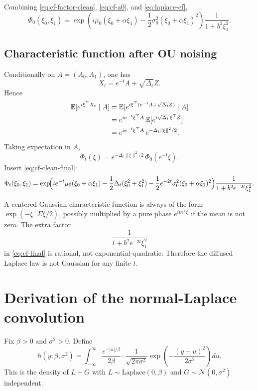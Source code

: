 \documentclass[11pt,a4paper]{article}
\newcommand{\E}{\mathbb{E}}
\newcommand{\Dt}{\Delta_t}
\begin{document}
Combining \eqref{eq:cf-factor-clean}, \eqref{eq:cf-a0}, and \eqref{eq:laplace-cf},
\begin{equation}
\Phi_0(\xi_0,\xi_1)
=
\exp\!\left(
 i\mu_0(\xi_0+\alpha\xi_1)
 - \frac12 \sigma_0^2 (\xi_0+\alpha\xi_1)^2
\right)
\frac{1}{1+b^2 \xi_1^2}.
\label{eq:cf-clean-final}
\end{equation}

\subsection{Characteristic function after OU noising}

Conditionally on $A=(A_0,A_1)$, one has
\[
X_t = e^{-t} A + \sqrt{\Dt} Z.
\]
Hence
\begin{align}
\E[e^{i\xi^\top X_t}\mid A]
&=
\E[e^{i\xi^\top(e^{-t}A+\sqrt{\Dt}Z)}\mid A]
\notag\\
&=
 e^{i e^{-t}\xi^\top A}
\, \E[e^{i\sqrt{\Dt}\,\xi^\top Z}]
\notag\\
&=
 e^{i e^{-t}\xi^\top A}
\, e^{-\Dt \|\xi\|^2/2}.
\label{eq:cf-conditional-noise}
\end{align}
Taking expectation in $A$,
\begin{equation}
\Phi_t(\xi) = e^{-\Dt\|\xi\|^2/2} \, \Phi_0(e^{-t}\xi).
\label{eq:cf-ou-rule}
\end{equation}
Insert \eqref{eq:cf-clean-final}:
\begin{equation}
\Phi_t(\xi_0,\xi_1)
=
\exp\!\Bigl(
 i e^{-t}\mu_0(\xi_0+\alpha\xi_1)
 -\frac12 \Dt (\xi_0^2+\xi_1^2)
 -\frac12 e^{-2t}\sigma_0^2 (\xi_0+\alpha\xi_1)^2
\Bigr)
\frac{1}{1+b^2 e^{-2t} \xi_1^2}.
\label{eq:cf-final}
\end{equation}

A centered Gaussian characteristic function is always of the form $\exp(-\xi^\top \Sigma \xi /2)$, possibly multiplied by a pure phase $e^{i m^\top \xi}$ if the mean is not zero. The extra factor
\[
\frac{1}{1+b^2 e^{-2t} \xi_1^2}
\]
in \eqref{eq:cf-final} is rational, not exponential-quadratic. Therefore the diffused Laplace law is not Gaussian for any finite $t$.

\section{Derivation of the normal-Laplace convolution}
\label{sec:normal-laplace}

Fix $\beta>0$ and $\sigma^2>0$. Define
\begin{equation}
h(y;\beta,\sigma^2)
=
\int_{-\infty}^{\infty}
\frac{e^{-|u|/\beta}}{2\beta}
\cdot
\frac{1}{\sqrt{2\pi\sigma^2}}
\exp\!\left(-\frac{(y-u)^2}{2\sigma^2}\right)du.
\label{eq:h-start}
\end{equation}
This is the density of $L+G$ with $L\sim\mathrm{Laplace}(0,\beta)$ and $G\sim\mathcal N(0,\sigma^2)$ independent.
\end{document}
